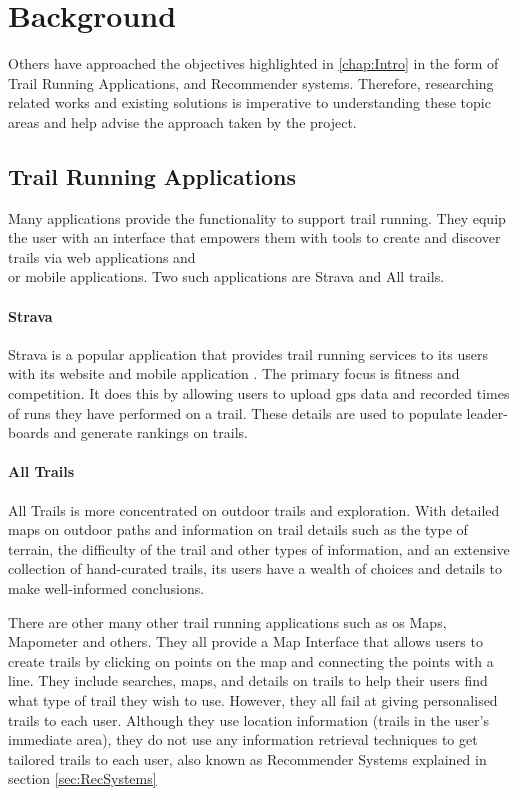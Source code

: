 \chapter{Background}
Others have approached the objectives highlighted in \autoref{chap:Intro} in the form of Trail Running Applications, and Recommender systems. Therefore, researching related works and existing solutions is imperative to understanding these topic areas and help advise the approach taken by the project.

\section{Trail Running Applications} \label{sec:TrailRunningApplications}
Many applications provide the functionality to support trail running. They equip the user with an interface that empowers them with tools to create and discover trails via web applications and\\or mobile applications. Two such applications are Strava and All trails.

\subsubsection{Strava}
Strava is a popular application that provides trail running services to its users with its website and mobile application \cite{strava}.  The primary focus is fitness and competition.  It does this by allowing users to upload \acrfull{gps} data and recorded times of runs they have performed on a trail. These details are used to populate leader-boards and generate rankings on trails.

\subsubsection{All Trails}
All Trails \cite{alltrails} is more concentrated on outdoor trails and exploration.  With detailed maps on outdoor paths and information on trail details such as the type of terrain, the difficulty of the trail and other types of information, and an extensive collection of hand-curated trails, its users have a wealth of choices and details to make well-informed conclusions.

There are other many other trail running applications such as \acrfull{os} Maps, Mapometer and others. They all provide a Map Interface that allows users to create trails by clicking on points on the map and connecting the points with a line. They include searches, maps, and details on trails to help their users find what type of trail they wish to use. However, they all fail at giving personalised trails to each user. Although they use location information (trails in the user's immediate area), they do not use any information retrieval techniques to get tailored trails to each user, also known as Recommender Systems explained in section \ref{sec:RecSystems}

